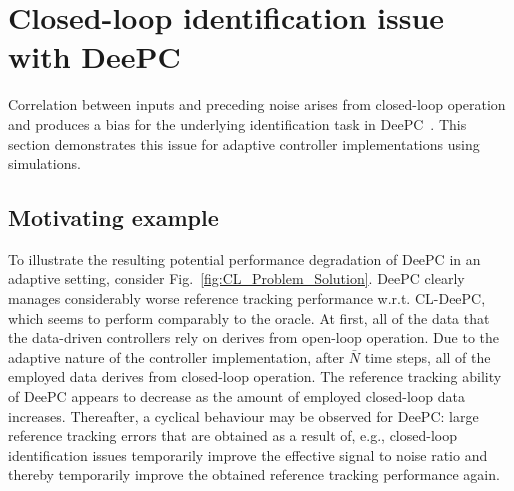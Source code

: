 \section{Closed-loop identification issue with \ac{DeePC}}\label{sec:CL_ID_issue}
Correlation between inputs and preceding noise arises from closed-loop operation and produces a bias for the underlying identification task in \ac{DeePC}~\citep{Dinkla2023}. This section demonstrates this issue for adaptive controller implementations using simulations.

\subsection{Motivating example}
To illustrate the resulting potential performance degradation of \ac{DeePC} in an adaptive setting, consider Fig.~\ref{fig:CL_Problem_Solution}. \ac{DeePC} clearly manages considerably worse reference tracking performance w.r.t. \ac{CL-DeePC}, which seems to perform comparably to the oracle. At first, all of the data that the data-driven controllers rely on derives from open-loop operation. Due to the adaptive nature of the controller implementation, after $\bar{N}$ time steps, all of the employed data derives from closed-loop operation. The reference tracking ability of \ac{DeePC} appears to decrease as the amount of employed closed-loop data increases. Thereafter, a cyclical behaviour may be observed for \ac{DeePC}: large reference tracking errors that are obtained as a result of, e.g., closed-loop identification issues temporarily improve the effective signal to noise ratio and thereby temporarily improve the obtained reference tracking performance again.
